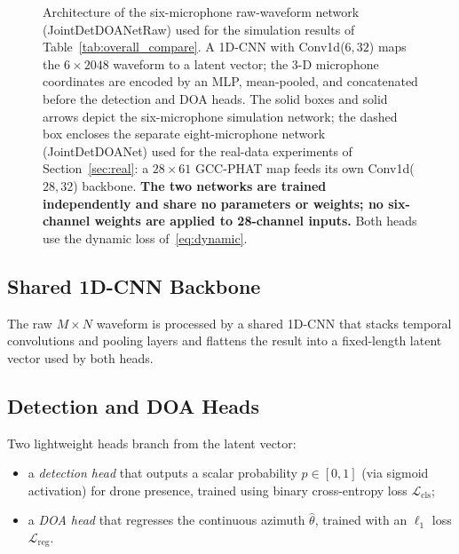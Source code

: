 \documentclass[sensors,article,submit,pdftex,moreauthors]{Definitions/mdpi}
\begin{document}
\begin{figure}[H]
\caption{Architecture of the six-microphone raw-waveform network (JointDetDOANetRaw) used for the simulation results of Table~\ref{tab:overall_compare}. A 1D-CNN with Conv1d($6,32$) maps the $6\times2048$ waveform to a latent vector; the 3-D microphone coordinates are encoded by an MLP, mean-pooled, and concatenated before the detection and DOA heads. The solid boxes and solid arrows depict the six-microphone simulation network; the dashed box encloses the separate eight-microphone network (JointDetDOANet) used for the real-data experiments of Section~\ref{sec:real}: a $28\times61$ GCC-PHAT map feeds its own Conv1d($28,32$) backbone. \textbf{The two networks are trained independently and share no parameters or weights; no six-channel weights are applied to 28-channel inputs.} Both heads use the dynamic loss of~\eqref{eq:dynamic}.}
\label{fig:arch}
\end{figure}

\subsection{Shared 1D-CNN Backbone}
The raw $M\times N$ waveform is processed by a shared 1D-CNN that stacks temporal convolutions and pooling layers and flattens the result into a fixed-length latent vector used by both heads.

\subsection{Detection and DOA Heads}
Two lightweight heads branch from the latent vector:
\begin{itemize}
    \item a \emph{detection head} that outputs a scalar probability $p\in[0,1]$ (via sigmoid activation) for drone presence, trained using binary cross-entropy loss $\mathcal{L}_{\mathrm{cls}}$;
    \item a \emph{DOA head} that regresses the continuous azimuth $\hat\theta$, trained with an $\ell_1$ loss $\mathcal{L}_{\mathrm{reg}}$.
\end{itemize}
\end{document}
